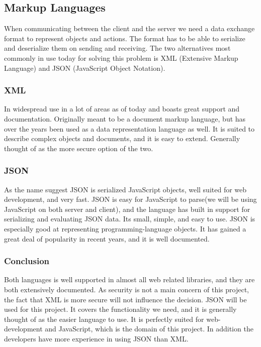 \subsection{Markup Languages}
When communicating between the client and the server we need a data exchange format to represent objects and actions. The format has to be able to serialize and deserialize them on sending and receiving. The two alternatives most commonly in use today for solving this problem is XML (Extensive Markup Language) and JSON (JavaScript Object Notation).

\subsubsection{XML}
In widespread use in a lot of areas as of today and boasts great support and documentation. Originally meant to be a document markup language, but has over the years been used as a data representation language as well. It is suited to describe complex objects and documents, and it is easy to extend. Generally thought of as the more secure option of the two.

\subsubsection{JSON}
As the name suggest JSON is serialized JavaScript objects, well suited for web development, and very fast. JSON is easy for JavaScript to parse(we will be using JavaScript on both server and client), and the language has built in support for serializing and evaluating JSON data. Its small, simple, and easy to use. JSON is especially good at representing programming-language objects. It has gained a great deal of popularity in recent years, and it is well documented.

\subsubsection{Conclusion}
Both languages is well supported in almost all web related libraries, and they are both extensively documented. As security is not a main concern of this project, the fact that XML is more secure will not influence the decision. JSON will be used for this project. It covers the functionality we need, and it is generally thought of as the easier language to use. It is perfectly suited for web- development and JavaScript, which is the domain of this project. In addition the developers have more experience in using JSON than XML.

